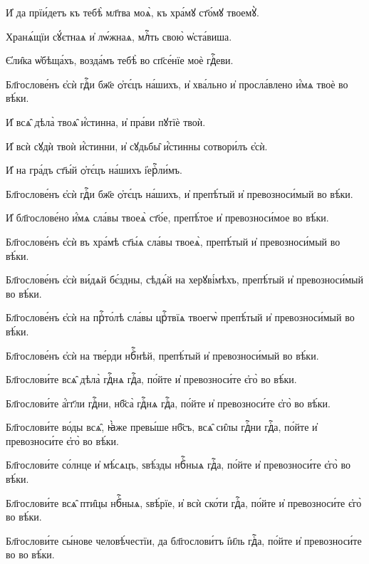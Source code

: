 \hKv И҆ да прїи́детъ къ тебѣ̀ мл҃тва моѧ̀, къ хра́мꙋ ст҃о́мꙋ  твоемꙋ̀.  
%

\hKv Хранѧ́щїи сꙋ́єтнаѧ и҆ лѡ́жнаѧ, млⷭ҇ть свою̀  ѡ҆ста́виша.  

\hKv Є҆ли̑ка ѡ҆бѣща́хъ, возда́мъ тебѣ̀ во сп҃се́нїе моѐ  гдⷭ҇еви.  
%

\hKv Бл҃гослове́нъ є҆сѝ гдⷭ҇и бж҃е ѻ҆тє́цъ на́шихъ, и҆  хва́льно и҆ просла́влено и҆́мѧ твоѐ во вѣ́ки.  

\hKv И҆ всѧ̑ дѣла̀ твоѧ̑ и҆́стинна, и҆ пра́ви пꙋтїѐ твоѝ. 

\hKv И҆ всѝ сꙋдѝ твоѝ и҆́стинни, и҆ сꙋдьбы̑ и҆́стинны  сотвори́лъ є҆сѝ. 

\hKv И҆ на гра́дъ ст҃ы́й ѻ҆тє́цъ на́шихъ і҆ерⷭ҇ли́мъ. 
%

\hKv Бл҃гослове́нъ є҆сѝ гдⷭ҇и бж҃е ѻ҆тє́цъ на́шихъ, и҆  препѣ́тый и҆ превозноси́мый во вѣ́ки. 

\hKv И҆ бл҃гослове́но и҆́мѧ сла́вы твоеѧ̀ ст҃о́е, препѣ́тое и҆  превозноси́мое во вѣ́ки. 
%

\hKv Бл҃гослове́нъ є҆сѝ въ хра́мѣ ст҃ы́ѧ сла́вы твоеѧ̀,  препѣ́тый и҆ превозноси́мый во вѣ́ки. 

\hKv Бл҃гослове́нъ є҆сѝ ви́дѧй бє́здны, сѣдѧ́й на  херꙋві́мѣхъ, препѣ́тый и҆ превозноси́мый во вѣ́ки. 
%

\hKv Бл҃гослове́нъ є҆сѝ на прⷭ҇то́лѣ сла́вы црⷭ҇твїѧ  твоегѡ̀ препѣ́тый и҆ превозноси́мый во вѣ́ки. 

\hKv Бл҃гослове́нъ є҆сѝ на тве́рди нбⷭ҇нѣй, препѣ́тый и҆  превозноси́мый во вѣ́ки.  
%

\hKv Бл҃гослови́те всѧ̑ дѣла̀ гдⷭ҇нѧ гдⷭ҇а, по́йте и҆  превозноси́те є҆го̀ во вѣ́ки. 

\hKv Бл҃гослови́те а҆́гг҃ли гдⷭ҇ни, нб҃са̀ гдⷭ҇нѧ гдⷭ҇а, по́йте  и҆ превозноси́те є҆го̀ во вѣ́ки. 

\hKv Бл҃гослови́те во́ды всѧ̑, ꙗ҆̀же превы́ше нб҃съ, всѧ̑ си̑лы  гдⷭ҇ни гдⷭ҇а, по́йте и҆ превозноси́те є҆го̀ во вѣ́ки. 

\hKv Бл҃гослови́те со́лнце и҆ мѣ́сѧцъ, ѕвѣ́зды нбⷭ҇ныѧ гдⷭ҇а,  по́йте и҆ превозноси́те є҆го̀ во вѣ́ки. 
%

\hKv Бл҃гослови́те всѧ̑ пти̑цы нбⷭ҇ныѧ, ѕвѣ́рїе, и҆ всѝ  ско́ти гдⷭ҇а, по́йте и҆ превозноси́те є҆го̀ во вѣ́ки. 

\hKv Бл҃гослови́те сы́нове человѣ́честїи, да бл҃гослови́тъ  і҆и҃ль гдⷭ҇а, по́йте и҆ превозноси́те во во вѣ́ки.  
%

